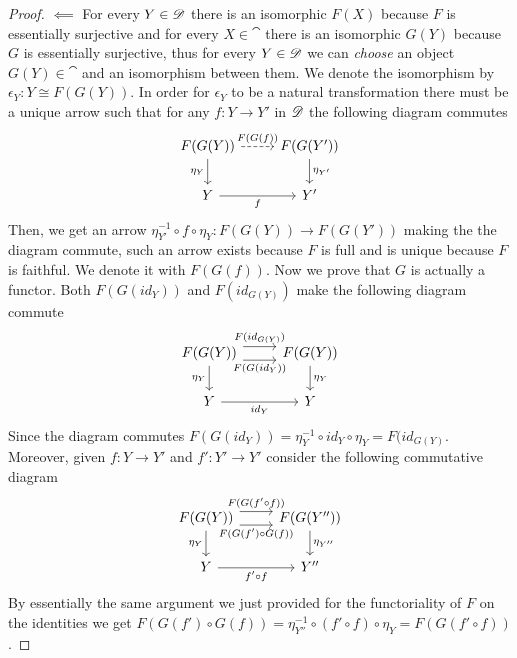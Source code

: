 \begin{proof}
\noindent $\impliedby$ For every $Y\in\mathscr{D}$ there is an isomorphic $F(X)$ because $F$ is essentially surjective and for every $X\in\cat$ there is an isomorphic $G(Y)$ because $G$ is essentially surjective, thus for every $Y\in\mathscr{D}$ we can \emph{choose} an object $G(Y)\in\cat$ and an isomorphism between them. We denote the isomorphism by $\epsilon_Y:Y\cong F(G(Y))$. In order for $\epsilon_Y$ to be a natural transformation there must be a unique arrow such that for any $f:Y\to Y'$ in  $\mathscr{D}$ the following diagram commutes 
\[\begin{tikzcd}
    {F(G(Y))} & {F(G(Y'))} \\
    Y & {Y'}
    \arrow["{F(G(f))}", dashed, from=1-1, to=1-2]
    \arrow["{\eta_Y}"', from=1-1, to=2-1]
    \arrow["f"', from=2-1, to=2-2]
    \arrow["{\eta_{Y'}}", from=1-2, to=2-2]
\end{tikzcd}\]
 Then, we get an arrow $\eta_{Y'}^{-1}\circ f\circ\eta_Y:F(G(Y))\to F(G(Y'))$ making the the diagram commute, such an arrow exists because $F$ is full and is unique because $F$ is faithful. We denote it with $F(G(f))$. Now we prove that $G$ is actually a functor. Both $F(G(id_Y))$ and $F(id_{G(Y)})$ make the following diagram commute 
\[\begin{tikzcd}
    {F(G(Y))} & {F(G(Y))} \\
    Y & Y
    \arrow["{F(id_{G(Y)})}", shift left=2, from=1-1, to=1-2]
    \arrow["{\eta_Y}"', from=1-1, to=2-1]
    \arrow["{id_Y}"', from=2-1, to=2-2]
    \arrow["{\eta_{Y}}", from=1-2, to=2-2]
    \arrow["{F(G(id_Y))}"', shift right=2, from=1-1, to=1-2]
\end{tikzcd}\]
Since the diagram commutes $F(G(id_Y))=\eta_{Y}^{-1}\circ id_Y\circ\eta_{Y}=F(id_{G(Y)}$. Moreover, given $f:Y\to Y'$ and $f':Y'\to Y'$ consider the following commutative diagram 
\[\begin{tikzcd}
    {F(G(Y))} & {F(G(Y''))} \\
    Y & {Y''}
    \arrow["{F(G(f'\circ f))}", shift left=2, from=1-1, to=1-2]
    \arrow["{\eta_Y}"', from=1-1, to=2-1]
    \arrow["{f'\circ f}"', from=2-1, to=2-2]
    \arrow["{\eta_{Y''}}", from=1-2, to=2-2]
    \arrow["{F(G(f')\circ G(f))}"', shift right=2, from=1-1, to=1-2]
\end{tikzcd}\]
By essentially the same argument we just provided for the functoriality of $F$ on the identities we get $F(G(f')\circ G(f))=\eta_{Y''}^{-1}\circ (f'\circ f)\circ\eta_Y=F(G(f'\circ f))$.


\end{proof}
